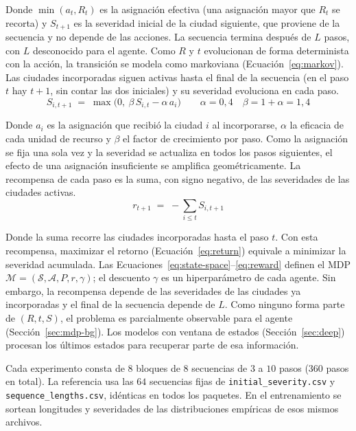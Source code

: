 \documentclass[../00_Main/Main.tex]{subfiles}
\begin{document}
Donde $\min(a_t, R_t)$ es la asignaci\'on efectiva (una asignaci\'on
mayor que $R_t$ se recorta) y $S_{t+1}$
es la severidad inicial de la ciudad siguiente, que proviene de la
secuencia y no depende de las acciones. La secuencia termina despu\'es de
$L$ pasos, con $L$ desconocido para el agente. Como $R$ y $t$ evolucionan
de forma determinista con la acci\'on, la transici\'on se modela como markoviana
(Ecuaci\'on~\eqref{eq:markov}). Las ciudades incorporadas siguen activas
hasta el final de la secuencia (en el paso $t$ hay $t + 1$, sin contar las
dos iniciales) y su severidad
evoluciona en cada paso.
\begin{equation}
S_{i,t+1} \;=\; \max\!\bigl(0,\ \beta\, S_{i,t} - \alpha\, a_{i}\bigr)
\qquad \alpha = 0{,}4 \quad \beta = 1 + \alpha = 1{,}4
\label{eq:transicion}
\end{equation}

Donde $a_i$ es la asignaci\'on que recibi\'o la ciudad $i$ al
incorporarse, $\alpha$ la eficacia de cada unidad de recurso y $\beta$
el factor de crecimiento por paso. Como la asignaci\'on se fija una sola
vez y la severidad se actualiza en todos los pasos siguientes, el
efecto de una asignaci\'on insuficiente se amplifica geom\'etricamente. La recompensa
de cada paso es la suma, con signo negativo, de las severidades de las
ciudades activas.
\begin{equation}
r_{t+1} \;=\; -\sum_{i \le t} S_{i,t+1}
\label{eq:reward}
\end{equation}

Donde la suma recorre las ciudades incorporadas hasta el paso $t$. Con
esta recompensa, maximizar el retorno (Ecuaci\'on~\eqref{eq:return})
equivale a minimizar la severidad acumulada. Las
Ecuaciones~\eqref{eq:state-space}--\eqref{eq:reward} definen el MDP
$\mathcal{M} = (\mathcal{S}, \mathcal{A}, P, r, \gamma)$; el descuento
$\gamma$ es un hiperpar\'ametro de cada agente. Sin embargo, la recompensa
depende de las severidades de las ciudades ya incorporadas y el final de la
secuencia depende de $L$. Como ninguno forma parte de $(R, t, S)$, el
problema es parcialmente observable para el agente
(Secci\'on~\ref{sec:mdp-bg}). Los modelos con ventana de estados
(Secci\'on~\ref{sec:deep}) procesan los \'ultimos estados para recuperar
parte de esa informaci\'on.

Cada experimento consta de $8$ bloques de $8$ secuencias de $3$ a $10$ pasos
($360$ pasos en total). La referencia usa las $64$ secuencias fijas de
\texttt{initial\_severity.csv} y \texttt{sequence\_lengths.csv}, id\'enticas
en todos los paquetes. En el entrenamiento se sortean longitudes y severidades
de las distribuciones emp\'iricas de esos mismos archivos.
\end{document}

